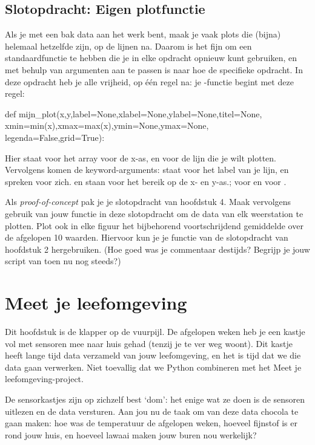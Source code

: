 \documentclass[a4paper,11pt, fleqn]{article}
\newcommand{\ditwc}{Naam van het huidige werkcollege}
\begin{document}
\subsection{Slotopdracht: Eigen plotfunctie}
Als je met een bak data aan het werk bent, maak je vaak plots die (bijna) helemaal hetzelfde zijn, op de lijnen na. Daarom is het fijn om een standaardfunctie te hebben die je in elke opdracht opnieuw kunt gebruiken, en met behulp van argumenten aan te passen is naar hoe de specifieke opdracht. In deze opdracht heb je alle vrijheid, op \'e\'en regel na: je -functie begint met deze regel:

\begin{python}
def mijn_plot(x,y,label=None,xlabel=None,ylabel=None,titel=None,
	    xmin=min(x),xmax=max(x),ymin=None,ymax=None,
	    legenda=False,grid=True):
\end{python}
Hier staat  voor het array voor de x-as, en  voor de lijn die je wilt plotten. Vervolgens komen de keyword-arguments: staat voor het label van je lijn,   en  spreken voor zich.  en  staan voor het bereik op de x- en y-as.;  voor  en  voor .

Als {\it proof-of-concept} pak je je slotopdracht van hoofdstuk 4. Maak vervolgens gebruik van jouw functie in deze slotopdracht om de data van elk weerstation te plotten. Plot ook in elke figuur het bijbehorend voortschrijdend gemiddelde over de afgelopen 10 waarden. Hiervoor kun je je functie van de slotopdracht van hoofdstuk 2 hergebruiken. (Hoe goed was je commentaar destijds? Begrijp je jouw script van toen nu nog steeds?)

\clearpage
\renewcommand{\ditwc}{Meet je leefomgeving}
\section[Meet je leefomgeving]{\ditwc}
Dit hoofdstuk is de klapper op de vuurpijl. De afgelopen weken heb je een kastje vol met sensoren mee naar huis gehad (tenzij je te ver weg woont). Dit kastje heeft lange tijd data verzameld van jouw leefomgeving, en het is tijd dat we die data gaan verwerken. Niet toevallig dat we Python combineren met het Meet je leefomgeving-project. 

De sensorkastjes zijn op zichzelf best `dom': het enige wat ze doen is de sensoren uitlezen en de data versturen. Aan jou nu de taak om van deze data chocola te gaan maken: hoe was de temperatuur de afgelopen weken, hoeveel fijnstof is er rond jouw huis, en hoeveel lawaai maken jouw buren nou werkelijk?
\end{document}
